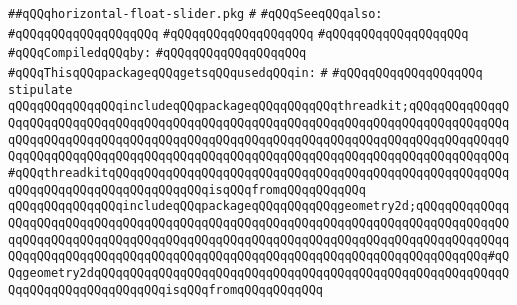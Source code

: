 \label{src/lib/x-kit/widget/leaf/horizontal-float-slider.pkg}
\verb|##qQQqhorizontal-float-slider.pkg|\newline
\verb|#|\newline
\verb|#qQQqSeeqQQqalso:|\newline
\verb|#qQQqqQQqqQQqqQQqqQQq|\newline
\verb|#qQQqqQQqqQQqqQQqqQQq|\newline
\verb|#qQQqqQQqqQQqqQQqqQQq|\newline
\newline
\verb|#qQQqCompiledqQQqby:|\newline
\verb|#qQQqqQQqqQQqqQQqqQQq|\newline
\newline
\newline
\newline
\verb|#qQQqThisqQQqpackageqQQqgetsqQQqusedqQQqin:|\newline
\verb|#|\newline
\verb|#qQQqqQQqqQQqqQQqqQQq|\newline
\newline
\verb|stipulate|\newline
\verb|qQQqqQQqqQQqqQQqincludeqQQqpackageqQQqqQQqqQQqthreadkit;qQQqqQQqqQQqqQQqqQQqqQQqqQQqqQQqqQQqqQQqqQQqqQQqqQQqqQQqqQQqqQQqqQQqqQQqqQQqqQQqqQQqqQQqqQQqqQQqqQQqqQQqqQQqqQQqqQQqqQQqqQQqqQQqqQQqqQQqqQQqqQQqqQQqqQQqqQQqqQQqqQQqqQQqqQQqqQQqqQQqqQQqqQQqqQQqqQQqqQQqqQQqqQQqqQQqqQQqqQQqqQQq#qQQqthreadkitqQQqqQQqqQQqqQQqqQQqqQQqqQQqqQQqqQQqqQQqqQQqqQQqqQQqqQQqqQQqqQQqqQQqqQQqqQQqqQQqqQQqisqQQqfromqQQqqQQqqQQq|\newline
\verb|qQQqqQQqqQQqqQQqincludeqQQqpackageqQQqqQQqqQQqgeometry2d;qQQqqQQqqQQqqQQqqQQqqQQqqQQqqQQqqQQqqQQqqQQqqQQqqQQqqQQqqQQqqQQqqQQqqQQqqQQqqQQqqQQqqQQqqQQqqQQqqQQqqQQqqQQqqQQqqQQqqQQqqQQqqQQqqQQqqQQqqQQqqQQqqQQqqQQqqQQqqQQqqQQqqQQqqQQqqQQqqQQqqQQqqQQqqQQqqQQqqQQqqQQqqQQqqQQqqQQqqQQq#qQQqgeometry2dqQQqqQQqqQQqqQQqqQQqqQQqqQQqqQQqqQQqqQQqqQQqqQQqqQQqqQQqqQQqqQQqqQQqqQQqqQQqqQQqisqQQqfromqQQqqQQqqQQq|\newline
